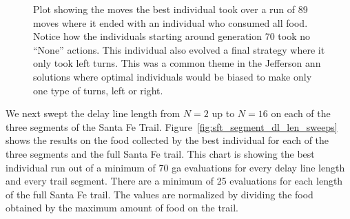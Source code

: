 \begin{figure}[hbt]
\centering
{}
\caption[Moves Type in Santa Fe Trail]{Plot showing the moves the best individual took over a run of 89 moves where it ended with an individual who consumed all food. Notice how the individuals starting around generation 70 took no ``None'' actions. This individual also evolved a final strategy where it only took left turns. This was a common theme in the Jefferson \gls{ann} solutions where optimal individuals would be biased to make only one type of turns, left or right.}
\label{fig:sft_none_evidence_plot}
\end{figure}

\clearpage
We next swept the delay line length from $N=2$ up to $N=16$ on each of the three segments of the Santa Fe Trail. Figure~\ref{fig:sft_segment_dl_len_sweeps} shows the results on the food collected by the best individual for each of the three segments and the full Santa Fe trail. This chart is showing the best individual run out of a minimum of 70 \gls{ga} evaluations for every delay line length and every trail segment. There are a minimum of 25 evaluations for each length of the full Santa Fe trail. The values are normalized by dividing the food obtained by the maximum amount of food on the trail.


